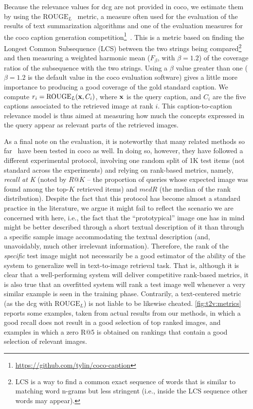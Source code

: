 Because the relevance values for \gls{dcg} are not provided in \gls{coco}, we estimate them by using the $\text{ROUGE}_L$~\cite{lin2004rouge} metric, a measure often used for the evaluation of the results of text summarization algorithms and one of the evaluation measures for the \gls{coco} caption generation competition\footnote{\url{https://github.com/tylin/coco-caption}}~\cite{chen2015microsoft}.
This is a metric based on finding the Longest Common Subsequence (LCS) between the two strings being compared\footnote{LCS is a way to find a common exact sequence of words that is similar to matching word n-grams but less stringent (i.e.,  inside the LCS sequence other words may appear).} and then measuring a weighted harmonic mean ($F_\beta$, with $\beta=1.2$) of the coverage ratios of the subsequence with the two strings.
Using a $\beta$ value greater than one ($\beta=1.2$ is the default value in the \gls{coco} evaluation software) gives a little more importance to producing a good coverage of the gold standard caption.
We compute $r_i = \text{ROUGE}_L ( \mathbf{x}, C_i ) $, where $\mathbf{x}$ is the query caption, and $C_i$ are the five captions associated to the retrieved image at rank $i$.
This caption-to-caption relevance model is thus aimed at measuring how much the concepts expressed in the query appear as relevant parts of the retrieved images.

As a final note on the evaluation, it is noteworthy that many related methods so far~\cite{mao2014deep,ma2015multimodal,klein2014fisher,karpathy2015deep,donahue2015long,kiros2015skip,wang2016learning} have been tested in \gls{coco} as well.
In doing so, however, they have followed a different experimental protocol, involving one random split of 1K test items (not standard across the experiments) and relying on rank-based metrics, namely, \emph{recall at K} (noted by $R@K$ -- the proportion of queries whose expected image was found among the top-$K$ retrieved items) and $medR$ (the median of the rank distribution).
Despite the fact that this protocol has become almost a standard practice in the literature, we argue it might fail to reflect the scenario we are concerned with here, i.e.,  the fact that the ``prototypical'' image one has in mind might be better described through a short textual description of it than through a specific sample image accommodating the textual description (and, unavoidably, much other irrelevant information).
Therefore, the rank of the \emph{specific} test image might not necessarily be a good estimator of the ability of the system to generalize well in text-to-image retrieval task.
That is, although it is clear that a well-performing system will deliver competitive rank-based metrics, it is also true that an overfitted system will rank a test image well whenever a very similar example is seen in the training phase.
Contrarily, a text-centered metric (as the \gls{dcg} with $\text{ROUGE}_L$) is not liable to be likewise cheated.
\ref{fig:t2v:metrics} reports some examples, taken from actual results from our methods, in which a good recall does not result in a good selection of top ranked images, and examples in which a zero R@5 is obtained on rankings that contain a good selection of relevant images.


